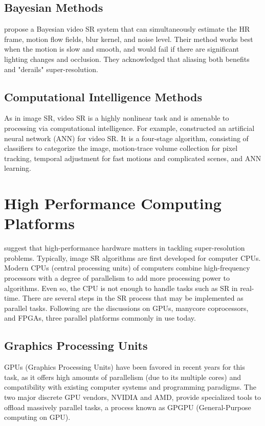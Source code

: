 \subsection{Bayesian Methods}

\cite{Liu2014} propose a Bayesian video SR system that can simultaneously estimate the HR frame, motion flow fields, blur kernel, and noise level.
Their method works best when the motion is slow and smooth, and would fail if there are significant lighting changes and occlusion.
They acknowledged that aliasing both benefits and "derails" super-resolution.


\subsection{Computational Intelligence Methods}
As in image SR, video SR is a highly nonlinear task and is amenable to processing via computational intelligence. 
For example, \cite{Cheng2013} constructed an artificial neural network (ANN) for video SR.
It is a four-stage algorithm, consisting of classifiers to categorize the image, motion-trace volume collection for pixel tracking, temporal adjustment for fast motions and complicated scenes, and ANN learning.

\section{High Performance Computing Platforms}
\cite{Yang2010a} suggest that high-performance hardware matters in tackling super-resolution problems. 
Typically, image SR algorithms are first developed for computer CPUs.
Modern CPUs (central processing units) of computers combine high-frequency processors with a degree of parallelism to add more processing power to algorithms.
Even so, the CPU is not enough to handle tasks such as SR in real-time.
There are several steps in the SR process that may be implemented as parallel tasks.
Following are the discussions on GPUs, manycore coprocessors, and FPGAs, three parallel platforms commonly in use today.

\subsection{Graphics Processing Units}
GPUs (Graphics Processing Units) have been favored in recent years for this task, as it offers high amounts of parallelism (due to its multiple cores) and compatibility with existing computer systems and programming paradigms.
The two major discrete GPU vendors, NVIDIA and AMD, provide specialized tools to offload massively parallel tasks, a process known as GPGPU (General-Purpose computing on GPU).

